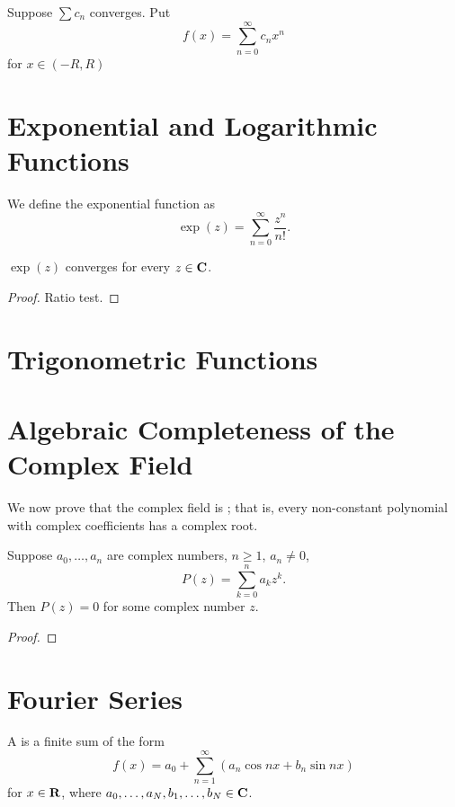 \begin{proposition}
Suppose $\sum c_n$ converges. Put
\[f(x)=\sum_{n=0}^\infty c_n x^n\]
for $x\in(-R,R)$
\end{proposition}

\section{Exponential and Logarithmic Functions}
\begin{definition}
We define the exponential function as
\begin{equation}
\exp(z)=\sum_{n=0}^\infty\frac{z^n}{n!}.
\end{equation}
\end{definition}

\begin{lemma}
$\exp(z)$ converges for every $z\in\mathbf C$.
\end{lemma}

\begin{proof}
Ratio test.
\end{proof}



\section{Trigonometric Functions}


\section{Algebraic Completeness of the Complex Field}
We now prove that the complex field is ; that is, every non-constant polynomial with complex coefficients has a complex root.

\begin{theorem}
Suppose $a_0,\dots,a_n$ are complex numbers, $n\ge1$, $a_n\neq0$,
\[P(z)=\sum_{k=0}^n a_kz^k.\]
Then $P(z)=0$ for some complex number $z$.
\end{theorem}

\begin{proof}

\end{proof}

\section{Fourier Series}
\begin{definition}
A  is a finite sum of the form
\[f(x)=a_0+\sum_{n=1}^\infty(a_n\cos nx+b_n\sin nx)\]
for $x\in\mathbf R$, where $a_0,\dots,a_N,b_1,\dots,b_N\in\mathbf C$.
\end{definition}

